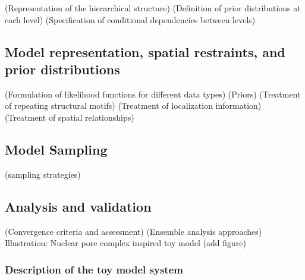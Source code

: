 \documentclass[pdflatex,sn-mathphys-num]{sn-jnl}%
\theoremstyle{thmstyleone}%
\newcommand{\ignacia}[1]{%
    \textcolor{ignacia} {#1}%
}
\theoremstyle{thmstyletwo}%
\theoremstyle{thmstylethree}%
\begin{document}
{


(Representation of the hierarchical structure)
(Definition of prior distributions at each level)
(Specification of conditional dependencies between levels)

\subsection{Model representation, spatial restraints, and prior distributions
}
(Formulation of likelihood functions for different data types)
(Priors)
(Treatment of repeating structural motifs)
(Treatment of localization information)
(Treatment of spatial relationships)


\subsection{Model Sampling}
(sampling strategies)

\subsection{Analysis and validation}
(Convergence criteria and assessment)
(Ensemble analysis approaches)
\ignacia{Illustration: Nuclear pore complex inspired toy model (add figure)}
\subsubsection{Description of the toy model system}

}
\end{document}
